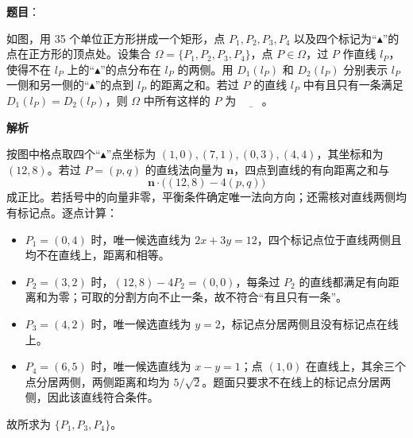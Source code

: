 \begin{answer}

\textbf{题目}：

如图，用 35 个单位正方形拼成一个矩形，点 $P_1,P_2,P_3,P_4$ 以及四个标记为“$\blacktriangle$”的点在正方形的顶点处。设集合 $\Omega=\{P_1,P_2,P_3,P_4\}$，点 $P\in\Omega$，过 $P$ 作直线 $l_P$，使得不在 $l_P$ 上的“$\blacktriangle$”的点分布在 $l_P$ 的两侧。用 $D_1(l_P)$ 和 $D_2(l_P)$ 分别表示 $l_P$ 一侧和另一侧的“$\blacktriangle$”的点到 $l_P$ 的距离之和。若过 $P$ 的直线 $l_P$ 中有且只有一条满足 $D_1(l_P)=D_2(l_P)$，则 $\Omega$ 中所有这样的 $P$ 为 $\underline{\qquad}$。
\nopagebreak[4]
\begin{center}\end{center}
\nopagebreak[4]
\textbf{解析}

按图中格点取四个“$\blacktriangle$”点坐标为 $(1,0),(7,1),(0,3),(4,4)$，其坐标和为 $(12,8)$。若过 $P=(p,q)$ 的直线法向量为 $\mathbf n$，四点到直线的有向距离之和与
\nopagebreak[4]
\[
\mathbf n\cdot\bigl((12,8)-4(p,q)\bigr)
\]
成正比。若括号中的向量非零，平衡条件确定唯一法向方向；还需核对直线两侧均有标记点。逐点计算：

\begin{itemize}
\item $P_1=(0,4)$ 时，唯一候选直线为 $2x+3y=12$，四个标记点位于直线两侧且均不在直线上，距离和相等。
\item $P_2=(3,2)$ 时，$(12,8)-4P_2=(0,0)$，每条过 $P_2$ 的直线都满足有向距离和为零；可取的分割方向不止一条，故不符合“有且只有一条”。
\item $P_3=(4,2)$ 时，唯一候选直线为 $y=2$，标记点分居两侧且没有标记点在线上。
\item $P_4=(6,5)$ 时，唯一候选直线为 $x-y=1$；点 $(1,0)$ 在直线上，其余三个点分居两侧，两侧距离和均为 $5/\sqrt2$。题面只要求不在线上的标记点分居两侧，因此该直线符合条件。
\end{itemize}

故所求为 $\{P_1,P_3,P_4\}$。


\end{answer}
